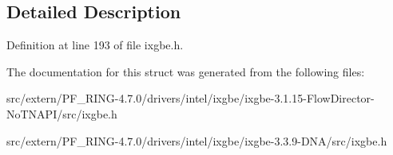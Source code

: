 \subsection{Detailed Description}


Definition at line 193 of file ixgbe.h.



The documentation for this struct was generated from the following files:\begin{DoxyCompactItemize}
\item 
src/extern/PF\_\-RING-\/4.7.0/drivers/intel/ixgbe/ixgbe-\/3.1.15-\/FlowDirector-\/NoTNAPI/src/ixgbe.h\item 
src/extern/PF\_\-RING-\/4.7.0/drivers/intel/ixgbe/ixgbe-\/3.3.9-\/DNA/src/ixgbe.h\end{DoxyCompactItemize}
